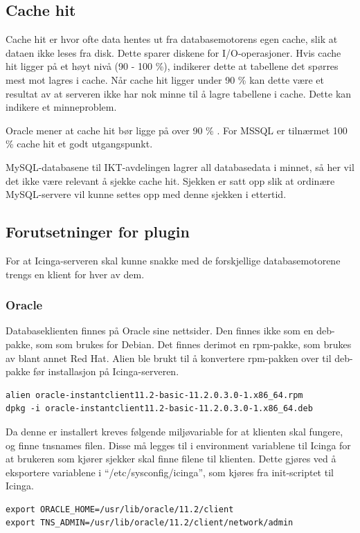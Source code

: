 \subsection*{Cache hit}
Cache hit er hvor ofte data hentes ut fra databasemotorens egen cache, slik at dataen ikke leses fra disk. Dette sparer diskene for I/O-operasjoner. Hvis cache hit ligger på et høyt nivå (90 - 100 \%), indikerer dette at tabellene det spørres mest mot lagres i cache. Når cache hit ligger under 90 \% kan dette være et resultat av at serveren ikke har nok minne til å lagre tabellene i cache. Dette kan indikere et minneproblem.

Oracle mener at cache hit bør ligge på over 90 \% \cite{oraclecachehit}. For MSSQL er tilnærmet 100 \% cache hit et godt utgangspunkt\cite{sqlmonitoring}.

MySQL-databasene til IKT-avdelingen lagrer all databasedata i minnet, så her vil det ikke være relevant å sjekke cache hit. Sjekken er satt opp slik at ordinære MySQL-servere vil kunne settes opp med denne sjekken i ettertid.

\subsection{Forutsetninger for plugin}
For at Icinga-serveren skal kunne snakke med de forskjellige databasemotorene trengs en klient for hver av dem. 

\subsubsection{Oracle}\label{sec:oracle}
Databaseklienten finnes på Oracle sine nettsider\cite{oracleclient}. Den finnes ikke som en deb-pakke, som som brukes for Debian. Det finnes derimot en rpm-pakke, som brukes av blant annet Red Hat. Alien ble brukt til å konvertere rpm-pakken over til deb-pakke før installasjon på Icinga-serveren\cite{debian:alien}.

\begin{lstlisting}[style=example]
alien oracle-instantclient11.2-basic-11.2.0.3.0-1.x86_64.rpm 
dpkg -i oracle-instantclient11.2-basic-11.2.0.3.0-1.x86_64.deb
\end{lstlisting}

Da denne er installert kreves følgende miljøvariable for at klienten skal fungere, og finne tnsnames filen.
Disse må legges til i environment variablene til Icinga for at brukeren som kjører sjekker skal finne filene til klienten. Dette gjøres ved å eksportere variablene i ``/etc/sysconfig/icinga'', som kjøres fra init-scriptet til Icinga.
\begin{lstlisting}[style=example]
export ORACLE_HOME=/usr/lib/oracle/11.2/client
export TNS_ADMIN=/usr/lib/oracle/11.2/client/network/admin
\end{lstlisting}


